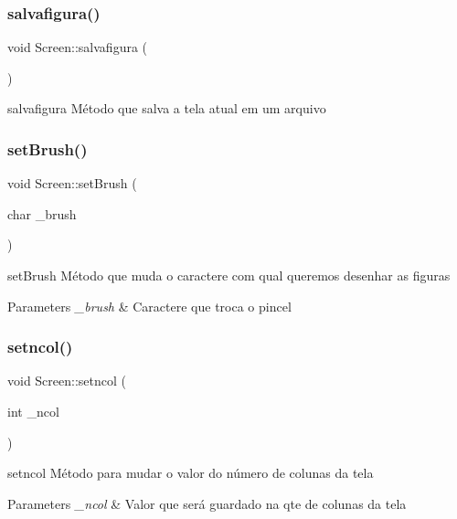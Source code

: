 \subsubsection{\texorpdfstring{salvafigura()}{salvafigura()}}
{\footnotesize\ttfamily void Screen\+::salvafigura (\begin{DoxyParamCaption}{ }\end{DoxyParamCaption})}



salvafigura Método que salva a tela atual em um arquivo 

\mbox{\label{class_screen_aebc4eb6cb5acf15a0f04c1494622ab23}} 
\subsubsection{\texorpdfstring{set\+Brush()}{setBrush()}}
{\footnotesize\ttfamily void Screen\+::set\+Brush (\begin{DoxyParamCaption}\item[{char}]{\+\_\+brush }\end{DoxyParamCaption})}



set\+Brush Método que muda o caractere com qual queremos desenhar as figuras 


\begin{DoxyParams}{Parameters}
{\em \+\_\+brush} & Caractere que troca o pincel \\
\hline
\end{DoxyParams}
\mbox{\label{class_screen_a07a26006fcf8b8169af511f1eff03a04}} 
\subsubsection{\texorpdfstring{setncol()}{setncol()}}
{\footnotesize\ttfamily void Screen\+::setncol (\begin{DoxyParamCaption}\item[{int}]{\+\_\+ncol }\end{DoxyParamCaption})}



setncol Método para mudar o valor do número de colunas da tela 


\begin{DoxyParams}{Parameters}
{\em \+\_\+ncol} & Valor que será guardado na qte de colunas da tela \\
\hline
\end{DoxyParams}
\mbox{\label{class_screen_ac4d187efda643cfc9127230d6363c721}} 

